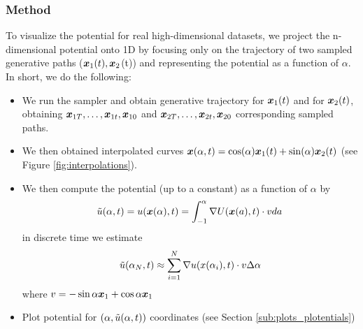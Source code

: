 \subsubsection{Method}
\label{sub:interpolation}
To visualize the potential for real high-dimensional datasets, we project the n-dimensional potential onto 1D by focusing only on the trajectory of two  sampled generative paths ($\boldsymbol{x}_1(t), \boldsymbol{x}_2$(t)) and representing the potential as a function of $\alpha$. In short, we do the following:
\begin{itemize}
    \item We run the sampler and obtain generative trajectory for $\boldsymbol{x}_1(t)$  and for $\boldsymbol{x}_2(t)$, obtaining $\boldsymbol{x}_{1T}, \dots, \boldsymbol{x}_{1t}, \boldsymbol{x}_{10}$  and   $\boldsymbol{x}_{2T}, \dots, \boldsymbol{x}_{2t}, \boldsymbol{x}_{20}$ corresponding sampled paths.
    \item We then obtained interpolated curves $\boldsymbol{x}(\alpha, t) = \cos(\alpha) \boldsymbol{x}_1(t) + \sin (\alpha) \boldsymbol{x}_2(t)$ (see Figure \ref{fig:interpolations}).
    \item We then compute the potential (up to a constant) as a function of $\alpha$ by
    $$\Tilde{u}(\alpha, t) = u(\boldsymbol{x}(\alpha), t)=\int_{-1}^{\alpha} \nabla U (\boldsymbol{x}(a), t) \cdot v da $$%
    in discrete time we estimate
    $$\Tilde{u}(\alpha_N, t) \approx \sum_{i=1}^N \nabla u (x(\alpha_i), t) \cdot v \Delta \alpha$$
    where $v= - \sin{\alpha} \boldsymbol{x}_1 +\cos{\alpha} \boldsymbol{x}_1  $
    \item Plot potential for $(\alpha, \Tilde{u}(\alpha, t))$ coordinates (see Section \ref{sub:plots_plotentials})
\end{itemize}

